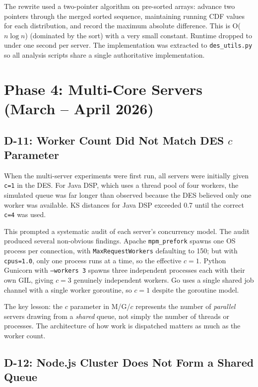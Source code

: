 The rewrite used a two-pointer algorithm on pre-sorted arrays: advance two pointers through the merged sorted sequence, maintaining running CDF values for each distribution, and record the maximum absolute difference. This is O($n \log n$) (dominated by the sort) with a very small constant. Runtime dropped to under one second per server. The implementation was extracted to \texttt{des\_utils.py} so all analysis scripts share a single authoritative implementation.

\section{Phase 4: Multi-Core Servers (March -- April 2026)}
\label{sec:journey-phase4}

\subsection{D-11: Worker Count Did Not Match DES $c$ Parameter}

When the multi-server experiments were first run, all servers were initially given \texttt{c=1} in the DES. For Java DSP, which uses a thread pool of four workers, the simulated queue was far longer than observed because the DES believed only one worker was available. KS distances for Java DSP exceeded 0.7 until the correct \texttt{c=4} was used.

This prompted a systematic audit of each server's concurrency model. The audit produced several non-obvious findings. Apache \texttt{mpm\_prefork} spawns one OS process per connection, with \texttt{MaxRequestWorkers} defaulting to 150; but with \texttt{cpus=1.0}, only one process runs at a time, so the effective $c = 1$. Python Gunicorn with \texttt{--workers 3} spawns three independent processes each with their own GIL, giving $c = 3$ genuinely independent workers. Go uses a single shared job channel with a single worker goroutine, so $c = 1$ despite the goroutine model.

The key lesson: the $c$ parameter in M/G/$c$ represents the number of \emph{parallel} servers drawing from a \emph{shared} queue, not simply the number of threads or processes. The architecture of how work is dispatched matters as much as the worker count.

\subsection{D-12: Node.js Cluster Does Not Form a Shared Queue}

